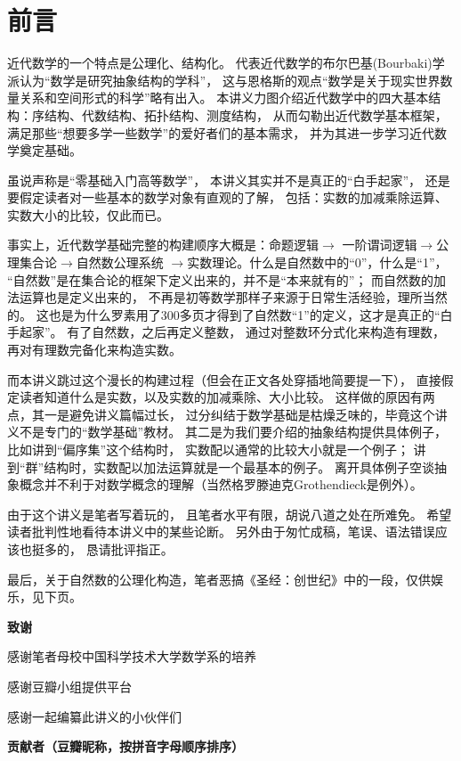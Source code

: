 \chapter*{前言}

近代数学的一个特点是公理化、结构化。
代表近代数学的布尔巴基(Bourbaki)学派认为“数学是研究抽象结构的学科”，
这与恩格斯的观点“数学是关于现实世界数量关系和空间形式的科学”略有出入。
本讲义力图介绍近代数学中的四大基本结构：序结构、代数结构、拓扑结构、测度结构，
从而勾勒出近代数学基本框架，满足那些“想要多学一些数学”的爱好者们的基本需求，
并为其进一步学习近代数学奠定基础。

虽说声称是“零基础入门高等数学”，
本讲义其实并不是真正的“白手起家”，
还是要假定读者对一些基本的数学对象有直观的了解，
包括：实数的加减乘除运算、实数大小的比较，仅此而已。

事实上，近代数学基础完整的构建顺序大概是：命题逻辑$\rightarrow$
一阶谓词逻辑$\rightarrow$公理集合论$\rightarrow$自然数公理系统
$\rightarrow$实数理论。什么是自然数中的“0”，什么是“1”，
“自然数”是在集合论的框架下定义出来的，并不是“本来就有的”；
而自然数的加法运算也是定义出来的，
不再是初等数学那样子来源于日常生活经验，理所当然的。
这也是为什么罗素用了300多页才得到了自然数“1”的定义，这才是真正的“白手起家”。
有了自然数，之后再定义整数，
通过对整数环分式化来构造有理数，
再对有理数完备化来构造实数。

而本讲义跳过这个漫长的构建过程（但会在正文各处穿插地简要提一下），
直接假定读者知道什么是实数，以及实数的加减乘除、大小比较。
这样做的原因有两点，其一是避免讲义篇幅过长，
过分纠结于数学基础是枯燥乏味的，毕竟这个讲义不是专门的“数学基础”教材。
其二是为我们要介绍的抽象结构提供具体例子，比如讲到“偏序集”这个结构时，
实数配以通常的比较大小就是一个例子；
讲到“群”结构时，实数配以加法运算就是一个最基本的例子。
离开具体例子空谈抽象概念并不利于对数学概念的理解（当然格罗滕迪克Grothendieck是例外）。

由于这个讲义是笔者写着玩的，
且笔者水平有限，胡说八道之处在所难免。
希望读者批判性地看待本讲义中的某些论断。
另外由于匆忙成稿，笔误、语法错误应该也挺多的，
恳请批评指正。

最后，关于自然数的公理化构造，笔者恶搞《圣经：创世纪》中的一段，仅供娱乐，见下页。
\newpage

\textbf{致谢}

感谢笔者母校中国科学技术大学数学系的培养

感谢豆瓣小组提供平台

感谢一起编纂此讲义的小伙伴们

\vspp
\textbf{贡献者（豆瓣昵称，按拼音字母顺序排序）}

